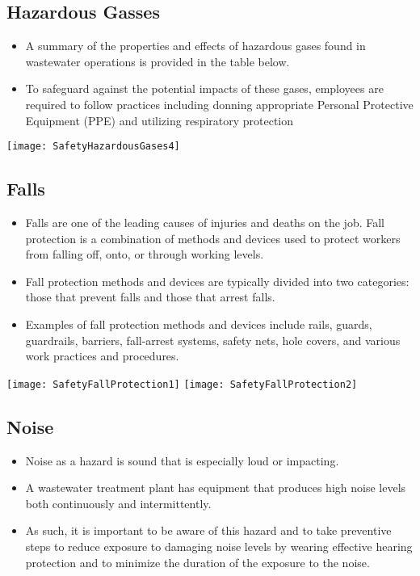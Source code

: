 \subsection{Hazardous Gasses}
\begin{itemize}
\item A summary of the properties and effects of hazardous gases found in wastewater operations is provided in the table below.
\item To safeguard against the potential impacts of these gases, employees are required to follow practices including donning appropriate Personal Protective Equipment (PPE) and utilizing respiratory protection\\
\end{itemize}
\begin{center}
\texttt{[image: SafetyHazardousGases4]}\\ 
\end{center}






\subsection{Falls}
\begin{itemize}
\item Falls are one of the leading causes of injuries and deaths on the job.  Fall protection is a combination of methods and devices used to protect workers from falling off, onto, or through working levels. 
\item Fall protection methods and devices are typically divided into two categories: those that prevent falls and those that arrest falls. 
\item Examples of fall protection methods and devices include rails, guards, guardrails, barriers, fall-arrest systems, safety nets, hole covers, and various work practices and procedures.
\end{itemize}
\begin{center}
\texttt{[image: SafetyFallProtection1]}\hspace{1cm} \texttt{[image: SafetyFallProtection2]}\\
\end{center}
\subsection{Noise}
\begin{itemize}
\item Noise as a hazard is sound that is especially loud or impacting. 
\item A wastewater treatment plant has equipment that produces high noise levels both continuously and intermittently. 
\item As such, it is important to be aware of this hazard and to take preventive steps to reduce exposure to damaging noise levels by wearing effective hearing protection and to minimize the duration of the exposure to the noise.
\end{itemize}

